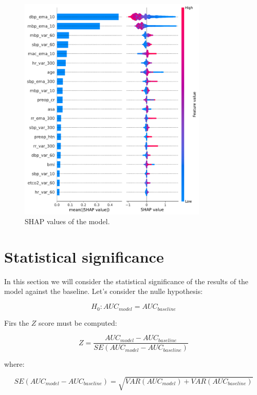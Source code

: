 \documentclass[a4paper,12pt]{article}
\begin{document}
\begin{figure}
    \centering
    \includegraphics[width= 0.8\textwidth]{figures/shap_xgboost.pdf}
    \caption{SHAP values of the model.}
    \label{fig:shap}
\end{figure}

\section{Statistical significance}

In this section we will consider the statistical significance of the results of the model against the baseline. Let's consider the nulle hypothesis:

\begin{equation}
    H_0: AUC_{model} = AUC_{baseline}
\end{equation}

Firs the $Z$ score must be computed:

\begin{equation}
    Z = \frac{AUC_{model} - AUC_{baseline}}{SE(AUC_{model} - AUC_{baseline})}
\end{equation}

where:

\begin{equation}
    SE(AUC_{model} - AUC_{baseline}) = \sqrt{VAR(AUC_{model}) + VAR(AUC_{baseline})}
\end{equation}
\end{document}
